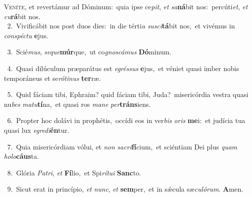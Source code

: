 \lettrine{\initial\textcolor{\initialcolor}{V}}{eníte,} et revertámur ad Dóminum:~\dagger quia ipse ce\-\textit{pit}\-, \textit{et} \textit{sa}\-\textbf{ná}bit nos:~\star percúti\-\textit{et}\-, \textit{et} \textit{cu}\-\textbf{rá}bit nos.\\
{\numbfont\textcolor{\numbcolor}{~2.}}~Vivificábit nos post duos dies:~\dagger in die térti\textit{a} \textit{su}\-\textit{sci}\textbf{tá}bit nos,~\star et vivémus in \textit{con}\-\textit{spéc}\textit{tu} \textbf{e}\-jus.\par
{\numbfont\textcolor{\numbcolor}{~3.}}~Scié\-\textit{mus}\-, \textit{se}\-\textit{que}\textbf{múr}que,~\star ut co\-\textit{gnos}\-\textit{cá}\textit{mus} \textbf{Dó}\-minum.\par
{\numbfont\textcolor{\numbcolor}{~4.}}~Quasi dilúculum præparátus est \textit{e}\-\textit{grés}\textit{sus} \textbf{e}\-jus,~\star et véniet quasi imber nobis temporáneus et se\-\textit{ró}\-\textit{ti}\textit{nus} \textbf{ter}\-ræ.\par
{\numbfont\textcolor{\numbcolor}{~5.}}~Quid fáciam tibi, Ephraim? quid fáciam tibi, Juda?~\dagger misericórdia vestra quasi nu\textit{bes} \textit{ma}\-\textit{tu}\textbf{tí}na,~\star et quasi ros \textit{ma}\-\textit{ne} \textit{per}\-\textbf{tráns}iens.\par
{\numbfont\textcolor{\numbcolor}{~6.}}~Propter hoc dolávi in prophétis,~\dagger occídi eos in ver\textit{bis} \textit{o}\-\textit{ris} \textbf{me}\-i:~\star et judícia tua quasi lux \textit{e}\-\textit{gre}\textit{di}\textbf{én}tur.\par
{\numbfont\textcolor{\numbcolor}{~7.}}~Quia misericórdiam vólui, et \textit{non} \textit{sa}\-\textit{cri}\textbf{fí}cium,~\star et sciéntiam Dei plus \textit{quam} \textit{ho}\-\textit{lo}\textbf{cáus}ta.\par
{\numbfont\textcolor{\numbcolor}{~8.}}~Glória \textit{Pa}\-\textit{tri}, \textit{et} \textbf{Fí}\-lio,~\star et Spi\-\textit{rí}\-\textit{tu}\textit{i} \textbf{Sanc}\-to.\par
{\numbfont\textcolor{\numbcolor}{~9.}}~Sicut erat in princípio, \textit{et} \textit{nunc}\-, \textit{et} \textbf{sem}\-per,~\star et in sǽcula sæ\-\textit{cu}\-\textit{ló}\textit{rum}. \textbf{A}\-men.\par
